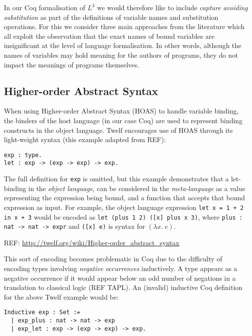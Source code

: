 \documentclass[]{unswthesis}
\begin{document}
In our Coq formalisation of $L^3$ we would therefore like to include \textit{capture avoiding substitution} as part of the definitions of variable names and substitution operations. For this we consider three main approaches from the literature which all exploit the observation that the exact names of bound variables are insignificant at the level of language formalisation. In other words, although the names of variables may hold meaning for the authors of programs, they do not impact the meanings of programs themselves.

\subsection{Higher-order Abstract Syntax}

When using Higher-order Abstract Syntax (HOAS) to handle variable binding, the binders of the host language (in our case Coq) are used to represent binding constructs in the object language. Twelf encourages use of HOAS through its light-weight syntax (this example adapted from REF):

\begin{verbatim}
exp : type.
let : exp -> (exp -> exp) -> exp.
\end{verbatim}

The full definition for \texttt{exp} is omitted, but this example demonstrates that a let-binding in the \textit{object language}, can be considered in the \textit{meta-language} as a value representing the expression being bound, and a function that accepts that bound expression as input. For example, the object language expression \texttt{let x = 1 + 2 in x + 3} would be encoded as \texttt{let (plus 1 2) ([x] plus x 3)}, where \texttt{plus : nat -> nat -> expr} and \texttt{([x] e)} is syntax for $(\lambda x. \; e)$.

REF: \url{http://twelf.org/wiki/Higher-order_abstract_syntax}

This sort of encoding becomes problematic in Coq due to the difficulty of encoding types involving \textit{negative occurrences} inductively. A type appears as a negative occurrence if it would appear below an odd number of negations in a translation to classical logic (REF TAPL). An (invalid) inductive Coq definition for the above Twelf example would be:

\begin{verbatim}
Inductive exp : Set :=
  | exp_plus : nat -> nat -> exp
  | exp_let : exp -> (exp -> exp) -> exp.
\end{verbatim}
\end{document}
